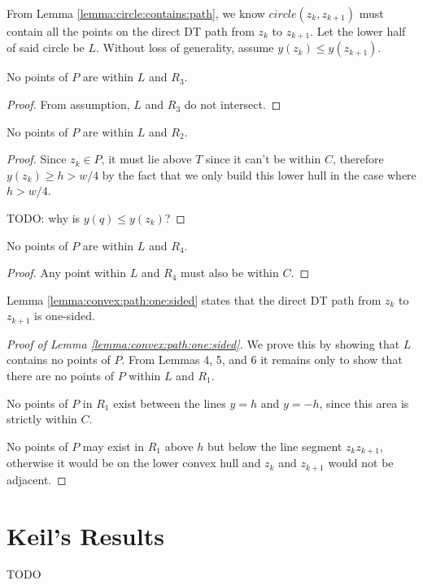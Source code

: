 \documentclass{tufte-handout}
\begin{document}
From Lemma \ref{lemma:circle:contains:path}, we know $circle(z_k,
z_{k+1})$ must contain all the points on the direct DT path from $z_k$
to $z_{k+1}$.  Let the lower half of said circle be $L$.  Without loss
of generality, assume $y(z_k) \le y(z_{k+1})$.

\begin{Note}

  No points of $P$ are within $L$ and $R_3$.
  
\end{Note}

\begin{proof}
  
  From assumption, $L$ and $R_3$ do not intersect.

\end{proof}

\begin{Note}

  No points of $P$ are within $L$ and $R_2$.
  
\end{Note}

\begin{proof}

  Since $z_k \in P$, it must lie above $T$ since it can't be within $C$,
  therefore $y(z_k) \ge h > w/4$ by the fact that we only build this
  lower hull in the case where $h > w/4$.

  TODO: why is $y(q) \le y(z_k)$?

\end{proof}

\begin{Note}

  No points of $P$ are within $L$ and $R_4$.
  
\end{Note}

\begin{proof}

  Any point within $L$ and $R_4$ must also be within $C$.

\end{proof}

Lemma \ref{lemma:convex:path:one:sided} states that the direct DT path
from $z_k$ to $z_{k+1}$ is one-sided.
  
\begin{proof}[Proof of Lemma \ref{lemma:convex:path:one:sided}]

  We prove this by showing that $L$ contains no points of $P$.  From
  Lemmas 4, 5, and 6 it remains only to show that there are no points
  of $P$ within $L$ and $R_1$.

  No points of $P$ in $R_1$ exist between the lines $y=h$ and $y=-h$,
  since this area is strictly within $C$.

  No points of $P$ may exist in $R_1$ above $h$ but below the line
  segment $z_kz_{k+1}$, otherwise it would be on the lower convex hull
  and $z_k$ and $z_{k+1}$ would not be adjacent.

\end{proof}

\newpage
\part{Keil's Results}

TODO


\newpage

\end{document}
